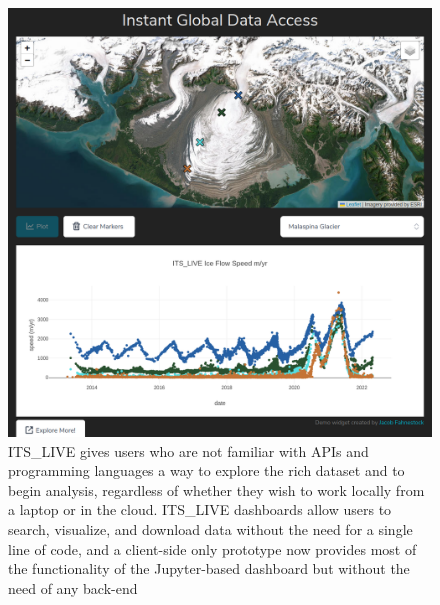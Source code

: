\documentclass[
  super,
  preprint,
  3p,
  twocolumn]{elsarticle}
\begin{document}
\begin{figure}

{\centering 

\includegraphics{figures/figure-5.png}

}

\caption{\label{fig-3}ITS\_LIVE gives users who are not familiar with
APIs and programming languages a way to explore the rich dataset and to
begin analysis, regardless of whether they wish to work locally from a
laptop or in the cloud. ITS\_LIVE dashboards allow users to search,
visualize, and download data without the need for a single line of code,
and a client-side only prototype now provides most of the functionality
of the Jupyter-based dashboard but without the need of any back-end
\citep[server][]{Fahnestock2023-fu}}

\end{figure}
\end{document}
